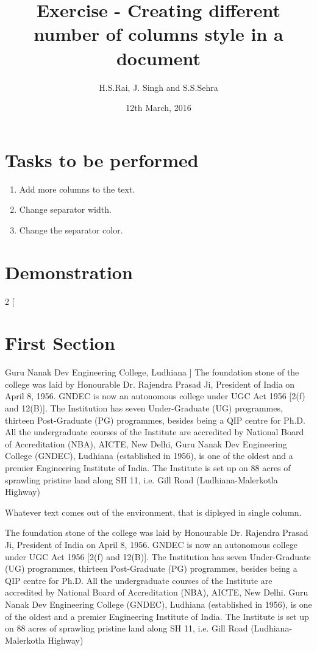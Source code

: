 \documentclass{article}
\title{Exercise  - Creating different number of columns style in a document}
\author{H.S.Rai, J. Singh and S.S.Sehra}
\date{12th March, 2016}
\begin{document}
	\maketitle	
	\section*{Tasks to be performed}
	\begin{enumerate}	
		\item Add more columns to the text.
		\item Change separator width.
		\item Change the separator color.
		\end{enumerate}
	\section*{Demonstration}
	\begin{multicols}{2}
		[
		\section{First Section}
		Guru Nanak Dev Engineering College, Ludhiana
		]
				 The foundation stone of the college
				 was laid by Honourable Dr. Rajendra Prasad Ji, President of India on April 8,
				 1956. GNDEC is now an autonomous college under UGC Act 1956 [2(f) and
				 12(B)]. The Institution has seven Under-Graduate (UG) programmes,
				 thirteen Post-Graduate (PG) programmes, besides being a QIP centre for
				 Ph.D. All the undergraduate courses of the Institute are accredited by
				 National Board of Accreditation (NBA), AICTE, New Delhi, Guru Nanak Dev Engineering College (GNDEC), Ludhiana (established in
				 1956), is one of the oldest and a premier Engineering Institute of India. The
				 Institute is set up on 88 acres of sprawling pristine land along SH 11, i.e. Gill
				 Road (Ludhiana-Malerkotla Highway)
	\end{multicols}
	Whatever text comes out of the environment, that is diplsyed in single column.
	

The foundation stone of the college
was laid by Honourable Dr. Rajendra Prasad Ji, President of India on April 8,
1956. GNDEC is now an autonomous college under UGC Act 1956 [2(f) and
12(B)]. The Institution has seven Under-Graduate (UG) programmes,
thirteen Post-Graduate (PG) programmes, besides being a QIP centre for
Ph.D. All the undergraduate courses of the Institute are accredited by
National Board of Accreditation (NBA), AICTE, New Delhi. 	Guru Nanak Dev Engineering College (GNDEC), Ludhiana (established in
1956), is one of the oldest and a premier Engineering Institute of India. The
Institute is set up on 88 acres of sprawling pristine land along SH 11, i.e. Gill
Road (Ludhiana-Malerkotla Highway)
\end{document}
